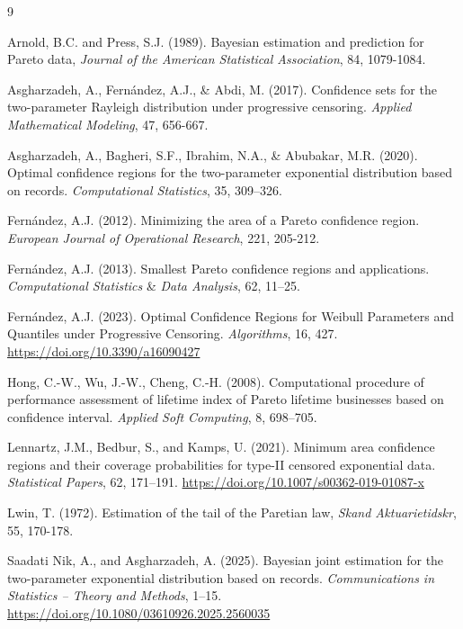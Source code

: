 \documentclass[twoside]{article}
\begin{document}
\begin{thebibliography}{9}
	
	Arnold, B.C. and Press, S.J. (1989). Bayesian estimation and prediction for Pareto data, \textit{Journal of the American Statistical Association}, 84, 1079-1084.
	
	 Asgharzadeh, A., Fern\'andez, A.J., \& Abdi, M. (2017). Confidence sets for the two-parameter Rayleigh distribution under progressive censoring. \textit{Applied Mathematical Modeling}, 47, 656-667.
	
	 Asgharzadeh, A., Bagheri, S.F., Ibrahim, N.A., \& Abubakar, M.R. (2020). Optimal confidence regions for the two-parameter exponential distribution based on records. \textit{Computational Statistics}, 35, 309–326.
	
	 Fern\'{a}ndez, A.J. (2012). Minimizing the area of a Pareto confidence region. \textit{European Journal of Operational Research}, 221, 205-212.
	
	 Fern\'{a}ndez, A.J. (2013). Smallest Pareto confidence regions and applications. \textit{Computational Statistics} \& \textit{Data Analysis}, 62, 11–25.	
	
	 Fern\'{a}ndez, A.J. (2023). Optimal Confidence Regions for Weibull Parameters and Quantiles under Progressive Censoring. \textit{Algorithms}, 16, 427. \url{https://doi.org/10.3390/a16090427}
	
	  Hong, C.-W., Wu, J.-W., Cheng, C.-H. (2008). Computational procedure of performance assessment of lifetime index of Pareto lifetime businesses based on
	confidence interval. \textit{Applied Soft Computing}, 8, 698–705.
	
	Lennartz, J.M., Bedbur, S., and Kamps, U. (2021).
	Minimum area confidence regions and their coverage probabilities for type-II censored exponential data.
	\textit{Statistical Papers}, 62, 171–191.
	\url{https://doi.org/10.1007/s00362-019-01087-x}
	
	Lwin, T. (1972). Estimation of the tail of the Paretian law, \textit{Skand Aktuarietidskr}, 55, 170-178.
	
	Saadati Nik, A., and Asgharzadeh, A. (2025).
	Bayesian joint estimation for the two-parameter exponential distribution based on records.
	\textit{Communications in Statistics – Theory and Methods}, 1–15.
	\url{https://doi.org/10.1080/03610926.2025.2560035}
	

\end{thebibliography}
\end{document}
